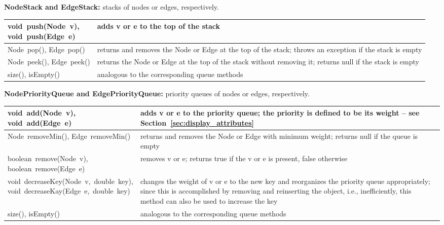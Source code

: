 \begin{table}
  \bigskip
  \textbf{NodeStack and EdgeStack:} stacks of nodes or edges, respectively.

  \medskip
  \begin{tabular}{| m{} | m{} |}
    \hline
    \shortstack[l]{
      \textsf{void~push(Node~v)},\\
      \textsf{void~push(Edge~e)}
    }
    &
    adds \textsf{v} or \textsf{e} to the top of the stack
    \\ \hline
    \textsf{Node~pop()}, \textsf{Edge~pop()}
    &
    returns and removes the \textsf{Node} or \textsf{Edge} at the top of the stack;
    throws an exception if the stack is empty
    \\ \hline
    \textsf{Node~peek()}, \textsf{Edge~peek()}
    &
    returns the \textsf{Node} or \textsf{Edge} at the top of the stack
    without removing it;
    returns null if the stack is empty
    \\ \hline
    \textsf{size()}, \textsf{isEmpty()}
    &
    analogous to the corresponding queue methods
    \\ \hline
  \end{tabular}

  \bigskip
  \textbf{NodePriorityQueue and EdgePriorityQueue:} priority queues of nodes or edges, respectively.

  \medskip
  \begin{tabular}{| m{} | m{} |}
    \hline
    \shortstack[l]{
      \textsf{void~add(Node~v)},\\
      \textsf{void~add(Edge~e)}
    }
    &
    adds \textsf{v} or \textsf{e} to the priority queue;
    the priority is defined to be its weight -- see Section~\ref{sec:display_attributes}
    \\ \hline
    \textsf{Node~removeMin()}, \textsf{Edge~removeMin()}
    &
    returns and removes the \textsf{Node} or \textsf{Edge} with minimum weight;
    returns \textsf{null} if the queue is empty
    \\ \hline
    \hline
    \shortstack[l]{
      \textsf{boolean~remove(Node~v)},\\
      \textsf{boolean~remove(Edge~e)}
    }
    &
    removes \textsf{v} or \textsf{e};
    returns \textsf{true} if the \textsf{v} or \textsf{e} is present,
    \textsf{false} otherwise
    \\ \hline
     \shortstack[l]{
      \textsf{void~decreaseKey(Node~v,~double~key)},\\
      \textsf{void~decreaseKay(Edge~e,~double~key)}
    }
    &
    changes the weight of \textsf{v} or \textsf{e} to the new key
    and reorganizes the priority queue appropriately;
    since this is accomplished by removing and reinserting the object, i.e.,
    inefficiently, this method can also be used to increase the key
    \\ \hline
    \textsf{size()}, \textsf{isEmpty()}
    &
    analogous to the corresponding queue methods
    \\ \hline
  \end{tabular}


\end{table}
